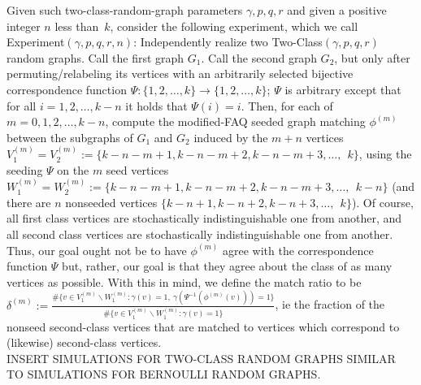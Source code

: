 \documentclass[12pt]{article}
\begin{document}
Given such two-class-random-graph parameters
$\gamma,p,q,r$  and given a positive
integer $n$ less than~$k$, consider the following experiment,
which we call Experiment$(\gamma,p,q,r,n)$:
Independently realize two
Two-Class$(\gamma,p,q,r)$ random graphs. Call the first graph $G_1$.
Call the second graph $G_2$, but only after permuting/relabeling its vertices
with an arbitrarily selected bijective correspondence function $\Psi:
\{1,2,\ldots,k \} \rightarrow \{ 1,2,\ldots,k \}$;
$\Psi$ is arbitrary except that for
all $i=1,2,\ldots,k-n$ it holds that $\Psi(i)=i$. Then, for each of
$m=0,1,2,\ldots,k-n$, compute the modified-FAQ seeded
graph matching $\phi^{(m)}$ between the subgraphs of $G_1$ and $G_2$ induced by the
$m+n$ vertices $V_1^{(m)}=V_2^{(m)}:=\{k-n-m+1,k-n-m+2,k-n-m+3,\ldots, \ \ k\}$,
 using the seeding $\Psi$ on the $m$ seed vertices
 $W_1^{(m)}=W_2^{(m)}:=\{k-n-m+1,k-n-m+2,k-n-m+3,\ldots,\ \ k-n\}$
(and there are $n$ nonseeded vertices $\{ k-n+1,k-n+2,k-n+3, \ldots, \ \ k \}$).
Of course, all first class vertices are stochastically
indistinguishable one from another, and all second class vertices
are stochastically indistinguishable one from another. Thus, our goal
ought not be to have $\phi^{(m)}$ agree with the correspondence function
$\Psi$ but, rather, our goal is that they agree about the class of
as many vertices as possible. With this in mind, we define the match ratio
to be $\delta^{(m)}:=\frac{\# \{ v \in   V_1^{(m)} \backslash W_1^{(m)}:
\gamma (v)=1, \
\gamma ( \Psi^{-1}(\phi^{(m)}(v)))=1
\}  }{\# \{ v \in V_1^{(m)} \backslash W_1^{(m)}:
\gamma (v)=1 \}}$, ie the fraction of the nonseed second-class vertices that
are matched to vertices which correspond to (likewise) second-class vertices. \\

INSERT SIMULATIONS FOR TWO-CLASS RANDOM GRAPHS SIMILAR TO 
SIMULATIONS FOR BERNOULLI RANDOM GRAPHS. 
\end{document}
